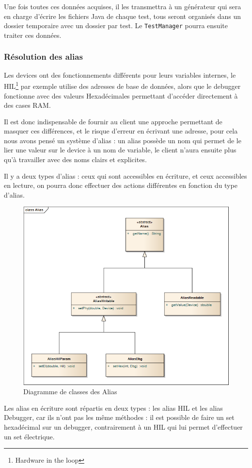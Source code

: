 	Une fois toutes ces données acquises, il les transmettra à un générateur qui sera en charge d'écrire les fichiers Java de chaque test, tous seront organisés dans un dossier temporaire avec un dossier par test. Le \texttt{TestManager} pourra ensuite traiter ces données.

	\subsubsection{Résolution des alias}\label{alias}
		Les devices ont des fonctionnements différents pour leurs variables internes, le HIL\footnote{Hardware in the loop} par exemple utilise des adresses de base de données, alors que le debugger fonctionne avec des valeurs Hexadécimales permettant d'accéder directement à des cases RAM.

		Il est donc indispensable de fournir au client une approche permettant de masquer ces différences, et le risque d'erreur en écrivant une adresse, pour cela nous avons pensé un système d'alias : un alias possède un nom qui permet de le lier une valeur sur le device à un nom de variable, le client n'aura ensuite plus qu'à travailler avec des noms clairs et explicites.

		Il y a deux types d'alias : ceux qui sont accessibles en écriture, et ceux accessibles en lecture, on pourra donc effectuer des actions différentes en fonction du type d'alias.

		\begin{figure}[H]
			\centering
			\includegraphics[width=13cm]{contents/images/classAlias.png}
			\caption{Diagramme de classes des Alias}
		\end{figure}
		Les alias en écriture sont répartis en deux types : les alias HIL et les alias Debugger, car ils n'ont pas les même méthodes : il est possible de faire un set hexadécimal sur un debugger, contrairement à un HIL qui lui permet d'effectuer un set électrique. 

